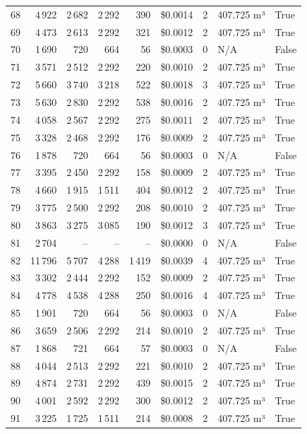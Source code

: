 \documentclass[a4paper,11pt]{article}
\begin{document}
\begin{table}[ht]
\begin{tabular}{r r r r r r r p{3cm} l}
68 & 4\,922 & 2\,682 & 2\,292 & 390 & \$0.0014 & 2 & 407.725 m³ & True \\
69 & 4\,473 & 2\,613 & 2\,292 & 321 & \$0.0012 & 2 & 407.725 m³ & True \\
70 & 1\,690 & 720 & 664 & 56 & \$0.0003 & 0 & N/A & False \\
71 & 3\,571 & 2\,512 & 2\,292 & 220 & \$0.0010 & 2 & 407.725 m³ & True \\
72 & 5\,660 & 3\,740 & 3\,218 & 522 & \$0.0018 & 3 & 407.725 m³ & True \\
73 & 5\,630 & 2\,830 & 2\,292 & 538 & \$0.0016 & 2 & 407.725 m³ & True \\
74 & 4\,058 & 2\,567 & 2\,292 & 275 & \$0.0011 & 2 & 407.725 m³ & True \\
75 & 3\,328 & 2\,468 & 2\,292 & 176 & \$0.0009 & 2 & 407.725 m³ & True \\
76 & 1\,878 & 720 & 664 & 56 & \$0.0003 & 0 & N/A & False \\
77 & 3\,395 & 2\,450 & 2\,292 & 158 & \$0.0009 & 2 & 407.725 m³ & True \\
78 & 4\,660 & 1\,915 & 1\,511 & 404 & \$0.0012 & 2 & 407.725 m³ & True \\
79 & 3\,775 & 2\,500 & 2\,292 & 208 & \$0.0010 & 2 & 407.725 m³ & True \\
80 & 3\,863 & 3\,275 & 3\,085 & 190 & \$0.0012 & 3 & 407.725 m³ & True \\
81 & 2\,704 & -- & -- & -- & \$0.0000 & 0 & N/A & False \\
82 & 11\,796 & 5\,707 & 4\,288 & 1\,419 & \$0.0039 & 4 & 407.725 m³ & True \\
83 & 3\,302 & 2\,444 & 2\,292 & 152 & \$0.0009 & 2 & 407.725 m³ & True \\
84 & 4\,778 & 4\,538 & 4\,288 & 250 & \$0.0016 & 4 & 407.725 m³ & True \\
85 & 1\,901 & 720 & 664 & 56 & \$0.0003 & 0 & N/A & False \\
86 & 3\,659 & 2\,506 & 2\,292 & 214 & \$0.0010 & 2 & 407.725 m³ & True \\
87 & 1\,868 & 721 & 664 & 57 & \$0.0003 & 0 & N/A & False \\
88 & 4\,044 & 2\,513 & 2\,292 & 221 & \$0.0010 & 2 & 407.725 m³ & True \\
89 & 4\,874 & 2\,731 & 2\,292 & 439 & \$0.0015 & 2 & 407.725 m³ & True \\
90 & 4\,001 & 2\,592 & 2\,292 & 300 & \$0.0012 & 2 & 407.725 m³ & True \\
91 & 3\,225 & 1\,725 & 1\,511 & 214 & \$0.0008 & 2 & 407.725 m³ & True \\

\end{tabular}
\end{table}
\end{document}
